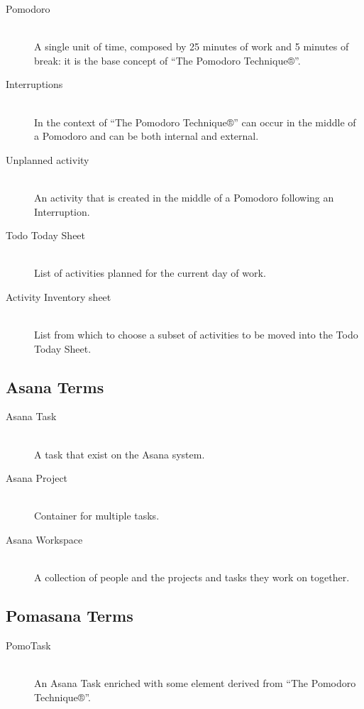 		\begin{description}

			\item [Pomodoro] \hfill \\
			A single unit of time, composed by 25 minutes of work and 5 minutes of break: it is the base concept of “The Pomodoro Technique®”.

			\item [Interruptions] \hfill \\
			In the context of “The Pomodoro Technique®” can occur in the middle of a Pomodoro and can be both internal and external.

			\item [Unplanned activity] \hfill \\
			An activity that is created in the middle of a Pomodoro following an Interruption.

			\item [Todo Today Sheet] \hfill \\
			List of activities planned for the current day of work.

			\item [Activity Inventory sheet] \hfill \\
			List from which to choose a subset of activities to be moved into the Todo Today Sheet.

		\end{description}

	\subsection{Asana Terms}

		\begin{description}

			\item [Asana Task] \hfill \\
			A task that exist on the Asana system.

			\item [Asana Project] \hfill \\
			Container for multiple tasks.

			\item [Asana Workspace] \hfill \\
			A collection of people and the projects and tasks they work on together.

		\end{description}


	\subsection{Pomasana Terms}
		\begin{description}

			\item [PomoTask] \hfill \\
			An Asana Task enriched with some element derived from “The Pomodoro Technique®”.

		\end{description}


